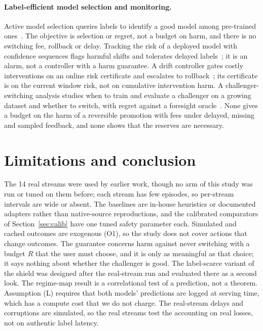 \documentclass[10pt]{article}
\theoremstyle{plain}
\theoremstyle{definition}
\begin{document}
\paragraph{Label-efficient model selection and monitoring.}
Active model selection queries labels to identify a good model among pre-trained ones~\citep{karimi2021online,liu2024cams}. The objective is selection or regret, not a budget on harm, and there is no switching fee, rollback or delay. Tracking the risk of a deployed model with confidence sequences flags harmful shifts and tolerates delayed labels~\citep{podkopaev2022tracking}; it is an alarm, not a controller with a harm guarantee. A drift controller gates costly interventions on an online risk certificate and escalates to rollback~\citep{lamaakal2026drift2act}; its certificate is on the current window risk, not on cumulative intervention harm. A challenger-switching analysis studies when to train and evaluate a challenger on a growing dataset and whether to switch, with regret against a foresight oracle~\citep{digalakis2025challenger}. None gives a budget on the harm of a reversible promotion with fees under delayed, missing and sampled feedback, and none shows that the reserves are necessary.

\section{Limitations and conclusion}
The 14 real streams were used by earlier work, though no arm of this study was run or tuned on them before; each stream has few episodes, so per-stream intervals are wide or absent. The baselines are in-house heuristics or documented adapters rather than native-source reproductions, and the calibrated comparators of Section~\ref{sec:calib} have one tuned safety parameter each. Simulated and cached outcomes are exogenous (O1), so the study does not cover actions that change outcomes. The guarantee concerns harm against never switching with a budget $R$ that the user must choose, and it is only as meaningful as that choice; it says nothing about whether the challenger is good. The label-scarce variant of the shield was designed after the real-stream run and evaluated there as a second look. The regime-map result is a correlational test of a prediction, not a theorem. Assumption (L) requires that both models' predictions are logged at serving time, which has a compute cost that we do not charge. The real-stream delays and corruptions are simulated, so the real streams test the accounting on real losses, not on authentic label latency.
\end{document}
